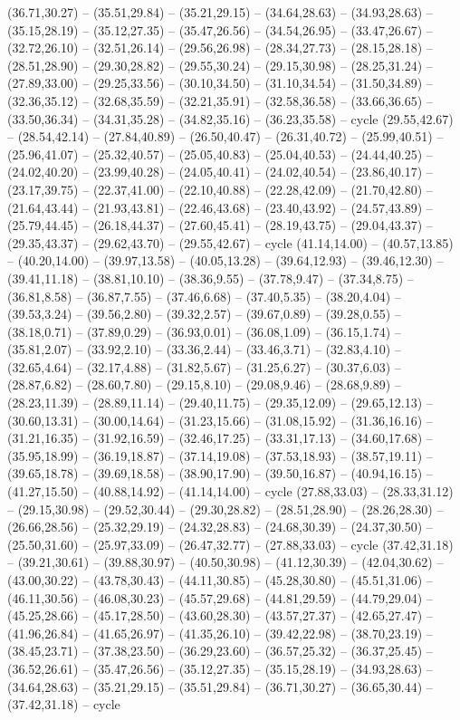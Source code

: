 {(36.71,30.27) -- (35.51,29.84) -- (35.21,29.15) -- (34.64,28.63) -- (34.93,28.63) -- (35.15,28.19) -- (35.12,27.35) -- (35.47,26.56) -- (34.54,26.95) -- (33.47,26.67) -- (32.72,26.10) -- (32.51,26.14) -- (29.56,26.98) -- (28.34,27.73) -- (28.15,28.18) -- (28.51,28.90) -- (29.30,28.82) -- (29.55,30.24) -- (29.15,30.98) -- (28.25,31.24) -- (27.89,33.00) -- (29.25,33.56) -- (30.10,34.50) -- (31.10,34.54) -- (31.50,34.89) -- (32.36,35.12) -- (32.68,35.59) -- (32.21,35.91) -- (32.58,36.58) -- (33.66,36.65) -- (33.50,36.34) -- (34.31,35.28) -- (34.82,35.16) -- (36.23,35.58) -- cycle (29.55,42.67) -- (28.54,42.14) -- (27.84,40.89) -- (26.50,40.47) -- (26.31,40.72) -- (25.99,40.51) -- (25.96,41.07) -- (25.32,40.57) -- (25.05,40.83) -- (25.04,40.53) -- (24.44,40.25) -- (24.02,40.20) -- (23.99,40.28) -- (24.05,40.41) -- (24.02,40.54) -- (23.86,40.17) -- (23.17,39.75) -- (22.37,41.00) -- (22.10,40.88) -- (22.28,42.09) -- (21.70,42.80) -- (21.64,43.44) -- (21.93,43.81) -- (22.46,43.68) -- (23.40,43.92) -- (24.57,43.89) -- (25.79,44.45) -- (26.18,44.37) -- (27.60,45.41) -- (28.19,43.75) -- (29.04,43.37) -- (29.35,43.37) -- (29.62,43.70) -- (29.55,42.67) -- cycle (41.14,14.00) -- (40.57,13.85) -- (40.20,14.00) -- (39.97,13.58) -- (40.05,13.28) -- (39.64,12.93) -- (39.46,12.30) -- (39.41,11.18) -- (38.81,10.10) -- (38.36,9.55) -- (37.78,9.47) -- (37.34,8.75) -- (36.81,8.58) -- (36.87,7.55) -- (37.46,6.68) -- (37.40,5.35) -- (38.20,4.04) -- (39.53,3.24) -- (39.56,2.80) -- (39.32,2.57) -- (39.67,0.89) -- (39.28,0.55) -- (38.18,0.71) -- (37.89,0.29) -- (36.93,0.01) -- (36.08,1.09) -- (36.15,1.74) -- (35.81,2.07) -- (33.92,2.10) -- (33.36,2.44) -- (33.46,3.71) -- (32.83,4.10) -- (32.65,4.64) -- (32.17,4.88) -- (31.82,5.67) -- (31.25,6.27) -- (30.37,6.03) -- (28.87,6.82) -- (28.60,7.80) -- (29.15,8.10) -- (29.08,9.46) -- (28.68,9.89) -- (28.23,11.39) -- (28.89,11.14) -- (29.40,11.75) -- (29.35,12.09) -- (29.65,12.13) -- (30.60,13.31) -- (30.00,14.64) -- (31.23,15.66) -- (31.08,15.92) -- (31.36,16.16) -- (31.21,16.35) -- (31.92,16.59) -- (32.46,17.25) -- (33.31,17.13) -- (34.60,17.68) -- (35.95,18.99) -- (36.19,18.87) -- (37.14,19.08) -- (37.53,18.93) -- (38.57,19.11) -- (39.65,18.78) -- (39.69,18.58) -- (38.90,17.90) -- (39.50,16.87) -- (40.94,16.15) -- (41.27,15.50) -- (40.88,14.92) -- (41.14,14.00) -- cycle (27.88,33.03) -- (28.33,31.12) -- (29.15,30.98) -- (29.52,30.44) -- (29.30,28.82) -- (28.51,28.90) -- (28.26,28.30) -- (26.66,28.56) -- (25.32,29.19) -- (24.32,28.83) -- (24.68,30.39) -- (24.37,30.50) -- (25.50,31.60) -- (25.97,33.09) -- (26.47,32.77) -- (27.88,33.03) -- cycle (37.42,31.18) -- (39.21,30.61) -- (39.88,30.97) -- (40.50,30.98) -- (41.12,30.39) -- (42.04,30.62) -- (43.00,30.22) -- (43.78,30.43) -- (44.11,30.85) -- (45.28,30.80) -- (45.51,31.06) -- (46.11,30.56) -- (46.08,30.23) -- (45.57,29.68) -- (44.81,29.59) -- (44.79,29.04) -- (45.25,28.66) -- (45.17,28.50) -- (43.60,28.30) -- (43.57,27.37) -- (42.65,27.47) -- (41.96,26.84) -- (41.65,26.97) -- (41.35,26.10) -- (39.42,22.98) -- (38.70,23.19) -- (38.45,23.71) -- (37.38,23.50) -- (36.29,23.60) -- (36.57,25.32) -- (36.37,25.45) -- (36.52,26.61) -- (35.47,26.56) -- (35.12,27.35) -- (35.15,28.19) -- (34.93,28.63) -- (34.64,28.63) -- (35.21,29.15) -- (35.51,29.84) -- (36.71,30.27) -- (36.65,30.44) -- (37.42,31.18) -- cycle }

